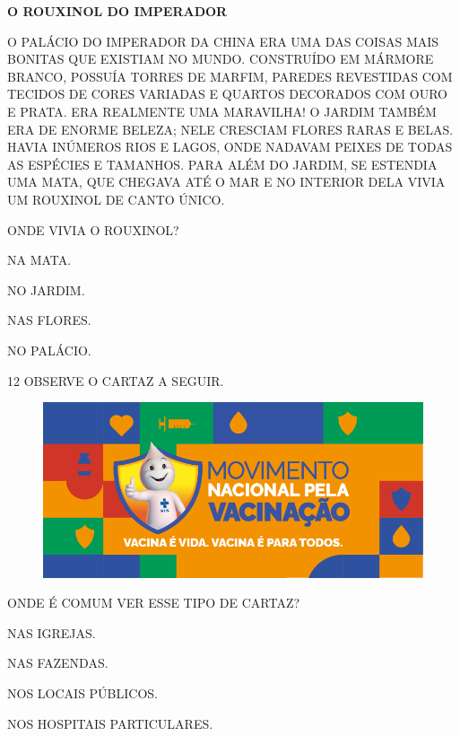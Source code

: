 \begin{myquote}
\textbf{O ROUXINOL DO IMPERADOR}

O PALÁCIO DO IMPERADOR DA CHINA ERA UMA DAS COISAS MAIS
BONITAS QUE EXISTIAM NO MUNDO. CONSTRUÍDO EM MÁRMORE
BRANCO, POSSUÍA TORRES DE MARFIM, PAREDES REVESTIDAS COM
TECIDOS DE CORES VARIADAS E QUARTOS DECORADOS COM OURO E
PRATA. ERA REALMENTE UMA MARAVILHA!
O JARDIM TAMBÉM ERA DE ENORME BELEZA; NELE CRESCIAM
FLORES RARAS E BELAS. HAVIA INÚMEROS RIOS E LAGOS, ONDE
NADAVAM PEIXES DE TODAS AS ESPÉCIES E TAMANHOS.
PARA ALÉM DO JARDIM, SE ESTENDIA UMA MATA, QUE
CHEGAVA ATÉ O MAR E NO INTERIOR DELA VIVIA UM ROUXINOL DE
CANTO ÚNICO.

\end{myquote}

ONDE VIVIA O ROUXINOL?

\begin{escolha}

\item NA MATA.

\item NO JARDIM.

\item NAS FLORES.

\item NO PALÁCIO. 

\end{escolha}

\num{12} OBSERVE O CARTAZ A SEGUIR.

\begin{figure}[H]
\centering
\includegraphics[width=.7\textwidth]{./media/image228.png}
\end{figure}

ONDE É COMUM VER ESSE TIPO DE CARTAZ?

\begin{escolha}

\item NAS IGREJAS.

\item NAS FAZENDAS.

\item NOS LOCAIS PÚBLICOS.

\item NOS HOSPITAIS PARTICULARES.

\end{escolha}

